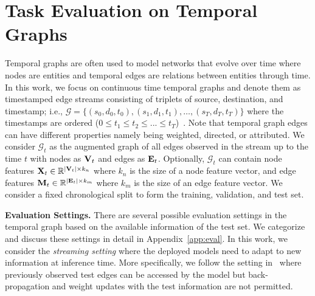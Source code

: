 \section{Task Evaluation on Temporal Graphs} \label{sec:task}
\vspace{-8pt}
Temporal graphs are often used to model networks that evolve over time where nodes are entities and temporal edges are relations between entities through time. In this work, we focus on continuous time temporal graphs and denote them as timestamped edge streams consisting of triplets of source, destination, and timestamp; i.e., $\mathcal{G}=\{ (s_0,d_0,t_0), (s_1,d_1,t_1), \dots , (s_T,d_T,t_T) \}$ where the timestamps are ordered (\textit{$0 \leq t_1 \leq t_2 \leq ... \leq t_T $})~\cite{poursafaeitowards,kazemi2020representation}. 
Note that temporal graph edges can have different properties namely being weighted, directed, or attributed. 
We consider $\mathcal{G}_t$ as the augmented graph of all edges observed in the stream up to the time $t$ with nodes as $\mathbf{V}_t$ and edges as $\mathbf{E}_t$.
Optionally, $\mathcal{G}_t$ can contain node features $\mathbf{X}_t \in \mathbb{R}^{|\mathbf{V}_t| \times k_n}$ where $k_n$ is the size of a node feature vector, and edge features $\mathbf{M}_t \in \mathbb{R}^{|\mathbf{E}_t| \times k_m}$ where $k_m$ is the size of an edge feature vector. 
We consider a fixed chronological split to form the training, validation, and test set. 



\textbf{Evaluation Settings.} There are several possible evaluation settings in the temporal graph based on the available information of the test set. 
We categorize and discuss these settings in detail in Appendix~\ref{app:eval}. 
In this work, we consider the \emph{streaming setting} where the deployed models need to adapt to new information at inference time. More specifically, we follow the setting in~\cite{rossi2020temporal} where previously observed test edges can be accessed by the model but back-propagation and weight updates with the test information are not permitted.



